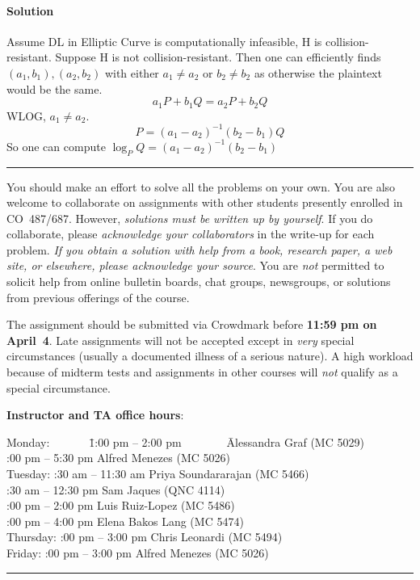 \documentclass[11pt]{article}
\begin{document}
\begin{enumerate}
\paragraph{Solution} Assume DL in Elliptic Curve is computationally infeasible, H is collision-resistant. Suppose H is not collision-resistant. Then one can efficiently finds $(a_1,b_1), (a_2,b_2)$ with either $a_1 \neq a_2$ or $b_2 \neq b_2$ as otherwise the plaintext would be the same.
\[
a_1P+b_1Q = a_2P+b_2Q
\]
WLOG, $a_1\neq a_2$.
\[ P=(a_1-a_2)^{-1}(b_2-b_1)Q
\]
So one can compute $\log_P Q = (a_1-a_2)^{-1}(b_2-b_1)$


\end{enumerate}


\hfill\hrule

\newpage
\vspace*{2mm}
\noindent
You should make an effort to solve all the problems on your own.
You are also welcome to collaborate on assignments with other students
presently enrolled in CO~487/687. However, \emph{solutions must be
written up by yourself}. If you do collaborate, please \emph{acknowledge
your collaborators} in the write-up for each problem. \emph{If you
obtain a solution with help from a book, research paper, a web site,
or elsewhere, please acknowledge your source}. You are \emph{not}
permitted to solicit help from online bulletin boards, chat groups,
newsgroups, or solutions from previous offerings of the course.

\vspace*{2mm}
\noindent
The assignment should be submitted via Crowdmark before {\bf 11:59 pm
on April~4}. Late assignments will not be accepted except in
\emph{very} special circumstances (usually a documented illness of
a serious nature). A high workload because of midterm tests and assignments
in other courses will \emph{not} qualify as a special circumstance.

\vspace*{4mm}
\noindent
{\bf Instructor and TA office hours}:
\begin{tabbing}
Monday:~~~~~~~\=1:00 pm -- 2:00 pm~~~~~~~~\= Alessandra Graf (MC 5029)\\
:00 pm -- 5:30 pm \> Alfred Menezes (MC 5026)\\
Tuesday: :30 am -- 11:30 am \> Priya Soundararajan (MC 5466)\\
:30 am -- 12:30 pm \> Sam Jaques (QNC 4114)\\
:00 pm -- 2:00 pm \> Luis Ruiz-Lopez (MC 5486)\\
:00 pm -- 4:00 pm \> Elena Bakos Lang (MC 5474)\\
Thursday: :00 pm -- 3:00 pm \> Chris Leonardi (MC 5494)\\
Friday: :00 pm -- 3:00 pm \> Alfred Menezes (MC 5026)
\end{tabbing}

\hfill\hrule
\end{document}
